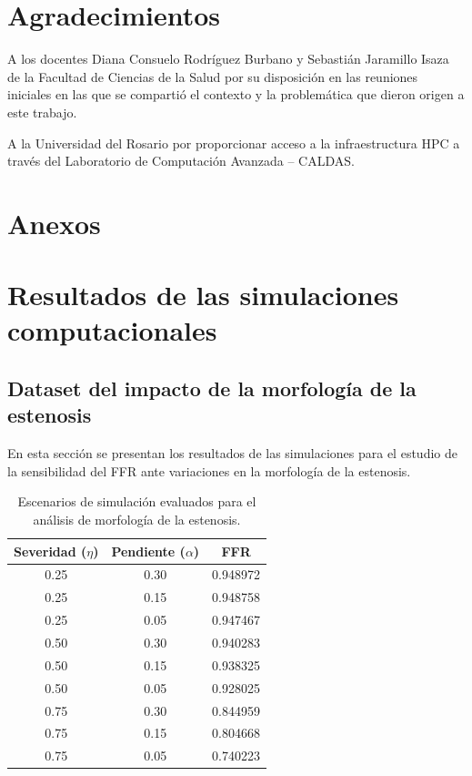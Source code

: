 \documentclass[12pt, letterpaper]{article}
\begin{document}
\section*{Agradecimientos}
A los docentes Diana Consuelo Rodríguez Burbano y Sebastián Jaramillo Isaza de la Facultad de Ciencias de la Salud por su disposición en las reuniones iniciales en las que se compartió el contexto y la problemática que dieron origen a este trabajo.

A la Universidad del Rosario por proporcionar acceso a la infraestructura HPC a través del Laboratorio de Computación Avanzada – CALDAS.

 


\newpage
\begin{appendices}
\section*{Anexos}
\section{Resultados de las simulaciones computacionales}
\label{app:resultados_simulaciones}

\subsection{Dataset del impacto de la morfología de la estenosis}
\label{app:morfologia_dataset}

En esta sección se presentan los resultados de las simulaciones para el estudio de la sensibilidad del FFR ante variaciones en la morfología de la estenosis.

\begin{table}[htbp]
  \centering
  \caption{Escenarios de simulación evaluados para el análisis de morfología de la estenosis.}
  \label{tab:ffr_morphology_dataset}
  \begin{tabular}{ccc}
    \toprule
    \textbf{Severidad ($\eta$)} & \textbf{Pendiente ($\alpha$)} & \textbf{FFR} \\ \midrule
    0.25 & 0.30 & 0.948972 \\
    0.25 & 0.15 & 0.948758 \\
    0.25 & 0.05 & 0.947467 \\
    0.50 & 0.30 & 0.940283 \\
    0.50 & 0.15 & 0.938325 \\
    0.50 & 0.05 & 0.928025 \\
    0.75 & 0.30 & 0.844959 \\
    0.75 & 0.15 & 0.804668 \\
    0.75 & 0.05 & 0.740223 \\ \bottomrule
  \end{tabular}
\end{table}


\end{appendices}
\end{document}

